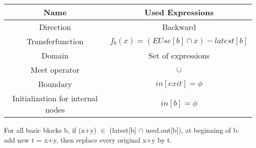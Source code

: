 \begin{center}
	\begin{tabular}{|c|c|}
		\hline Name                              & Used Expressions                             \\
		\hline Direction                         & Backward                                     \\
		\hline Transferfunction                  & \( f_b (x) = (EUse[b] \cap x) - latest[b] \) \\
		\hline Domain                            & Set of expressions                           \\
		\hline Meet operator                     & \( \cup \)                                   \\
		\hline Boundary                          & $in[exit] = \phi$                            \\
		\hline Initialization for internal nodes & \( in[b] = \phi \)                           \\
		\hline
	\end{tabular}
\end{center}


For all basic blocks b, if (x+y) $\in$ (latest[b] $\cap$ used.out[b]), at beginning of b:
add new t = x+y, then replace every original x+y by t.





